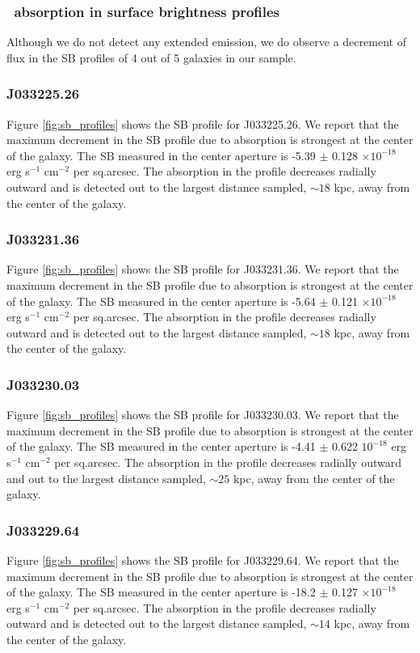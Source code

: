 \documentclass[twocolumn]{aastex61}
\begin{document}
\subsubsection{\ absorption in surface brightness profiles}
Although we do not detect any extended  emission, we do observe a decrement of flux in the SB profiles of 4 out of 5 galaxies in our sample. 

\subsubsection{J033225.26} 
Figure \ref{fig:sb_profiles} shows the SB profile for J033225.26. We report that the maximum decrement in the SB profile due to absorption is strongest at the center of the galaxy. The SB measured in the center aperture is -5.39 $\pm$ 0.128 $\times10^{-18}$ erg s$^{-1}$ cm$^{-2}$ per sq.arcsec. The absorption in the profile decreases radially outward and is detected out to the largest distance sampled, $\sim 18$ kpc, away from the center of the galaxy.

\subsubsection{J033231.36} 
Figure \ref{fig:sb_profiles} shows the SB profile for J033231.36. We report that the maximum decrement in the SB profile due to absorption is strongest at the center of the galaxy. The SB measured in the center aperture is -5.64 $\pm$ 0.121 $\times10^{-18}$ erg s$^{-1}$ cm$^{-2}$ per sq.arcsec. The absorption in the profile decreases radially outward and is detected out to the largest distance sampled, $\sim 18$ kpc, away from the center of the galaxy.

\subsubsection{J033230.03} 
Figure \ref{fig:sb_profiles} shows the SB profile for J033230.03. We report that the maximum decrement in the SB profile due to absorption is strongest at the center of the galaxy. The SB measured in the center aperture is -4.41 $\pm$ 0.622 $10^{-18}$ erg s$^{-1}$ cm$^{-2}$ per sq.arcsec. The absorption in the profile decreases radially outward and out to the largest distance sampled, $\sim 25$ kpc, away from the center of the galaxy.

\subsubsection{J033229.64} 
Figure \ref{fig:sb_profiles} shows the SB profile for J033229.64. We report that the maximum decrement in the SB profile due to absorption is strongest at the center of the galaxy. The SB measured in the center aperture is -18.2 $\pm$ 0.127 $\times10^{-18}$ erg s$^{-1}$ cm$^{-2}$ per sq.arcsec. The absorption in the profile decreases radially outward and is detected out to the largest distance sampled, $\sim 14$ kpc, away from the center of the galaxy.
\end{document}
